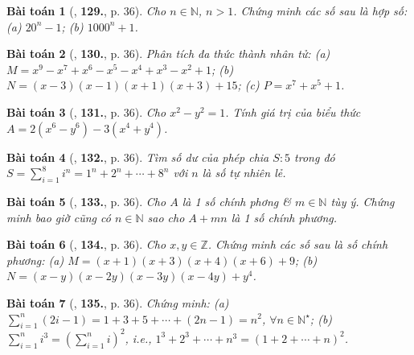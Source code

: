 \documentclass{article}
\numberwithin{equation}{section}
\newtheorem{baitoan}{Bài toán}
\begin{document}
\begin{baitoan}[\cite{Tuyen_Toan_8}, \textbf{129.}, p. 36]
	Cho $n\in\mathbb{N}$, $n > 1$. Chứng minh các số sau là hợp số: (a) $20^n - 1$; (b) $1000^n + 1$.
\end{baitoan}

\begin{baitoan}[\cite{Tuyen_Toan_8}, \textbf{130.}, p. 36]
	Phân tích đa thức thành nhân tử: (a) $M = x^9 - x^7 + x^6 - x^5 - x^4 + x^3 - x^2 + 1$; (b) $N = (x - 3)(x - 1)(x + 1)(x + 3) + 15$; (c) $P = x^7 + x^5 + 1$.
\end{baitoan}

\begin{baitoan}[\cite{Tuyen_Toan_8}, \textbf{131.}, p. 36]
	Cho $x^2 - y^2 = 1$. Tính giá trị của biểu thức $A = 2(x^6 - y^6) - 3(x^4 + y^4)$.
\end{baitoan}

\begin{baitoan}[\cite{Tuyen_Toan_8}, \textbf{132.}, p. 36]
	Tìm số dư của phép chia $S:5$ trong đó $S = \sum_{i=1}^8 i^n = 1^n + 2^n + \cdots + 8^n$ với $n$ là số tự nhiên lẻ.
\end{baitoan}

\begin{baitoan}[\cite{Tuyen_Toan_8}, \textbf{133.}, p. 36]
	Cho $A$ là 1 số chính phơng \& $m\in\mathbb{N}$ tùy ý. Chứng minh bao giờ cũng có $n\in\mathbb{N}$ sao cho $A + mn$ là 1 số chính phương.
\end{baitoan}

\begin{baitoan}[\cite{Tuyen_Toan_8}, \textbf{134.}, p. 36]
	Cho $x,y\in\mathbb{Z}$. Chứng minh các số sau là số chính phương: (a) $M = (x + 1)(x + 3)(x + 4)(x + 6) + 9$; (b) $N = (x - y)(x - 2y)(x - 3y)(x - 4y) + y^4$.
\end{baitoan}

\begin{baitoan}[\cite{Tuyen_Toan_8}, \textbf{135.}, p. 36]
	Chứng minh: (a) $\sum_{i=1}^n (2i - 1) = 1 + 3 + 5 + \cdots + (2n - 1) = n^2$, $\forall n\in\mathbb{N}^\star$; (b) $\sum_{i=1}^n i^3 = (\sum_{i=1}^n i)^2$, i.e., $1^3 + 2^3 + \cdots + n^3 = (1 + 2 + \cdots + n)^2$.
\end{baitoan}


\printbibliography[heading=bibintoc]
	
\end{document}
